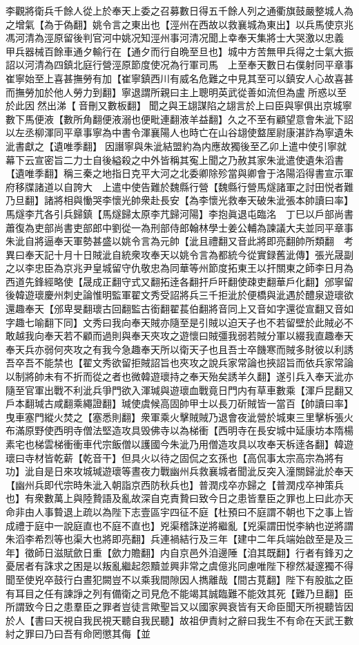 李觀將衛兵千餘人從上於奉天上委之召募數日得五千餘人列之通衢旗鼓嚴整城人為之增氣【為于偽翻】姚令言之東出也【涇州在西故以救襄城為東出】以兵馬使京兆馮河清為涇原留後判官河中姚况知涇州事河清况聞上幸奉天集將士大哭激以忠義甲兵器械百餘車通夕輸行在【通夕而行自晩至旦也】城中方苦無甲兵得之士氣大振詔以河清為四鎮北庭行營涇原節度使况為行軍司馬　上至奉天數日右僕射同平章事崔寧始至上喜甚撫勞有加【崔寧鎮西川有威名危難之中見其至可以鎮安人心故喜甚而撫勞加於他人勞力到翻】寧退謂所親曰主上聰明英武從善如流但為盧所惑以至於此因然出涕【音刪又數板翻】聞之與王翃謀陷之翃言於上曰臣與寧俱出京城寧數下馬便液【數所角翻便液溺也便毗連翻液羊益翻】久之不至有顧望意會朱泚下詔以左丞柳渾同平章事寧為中書令渾襄陽人也時亡在山谷翃使盩厔尉康湛詐為寧遺朱泚書獻之【遺唯季翻】因譖寧與朱泚結盟約為内應故獨後至乙卯上遣中使引寧就幕下云宣密旨二力士自後縊殺之中外皆稱其寃上聞之乃赦其家朱泚遣使遺朱滔書【遺唯季翻】稱三秦之地指日克平大河之北委卿除殄當與卿會于洛陽滔得書宣示軍府移牒諸道以自誇大　上遣中使告難於魏縣行營【魏縣行營馬燧諸軍之討田悦者難乃旦翻】諸將相與慟哭李懷光帥衆赴長安【為李懷光救奉天破朱泚張本帥讀曰率】馬燧李芁各引兵歸鎮【馬燧歸太原李芁歸河陽】李抱眞退屯臨洺　丁巳以戶部尚書蕭復為吏部尚書吏部郎中劉從一為刑部侍郎翰林學士姜公輔為諫議大夫並同平章事　朱泚自將逼奉天軍勢甚盛以姚令言為元帥【泚且禮翻又音此將即亮翻帥所類翻　考異曰奉天記十月十日賊泚自統衆攻奉天以姚令言為都統今從實録舊泚傳】張光晟副之以李忠臣為京兆尹皇城留守仇敬忠為同華等州節度拓東王以扞關東之師李日月為西道先鋒經略使【晟成正翻守式又翻拓逹各翻扞戶旰翻使疎吏翻華戶化翻】邠寧留後韓遊瓌慶州刺史論惟明監軍翟文秀受詔將兵三千拒泚於便橋與泚遇於醴泉遊瓌欲還趣奉天【邠卑旻翻瓌古回翻監古銜翻翟萇伯翻將音同上又音如字還從宣翻又音如字趣七喻翻下同】文秀曰我向奉天賊亦隨至是引賊以迫天子也不若留壁於此賊必不敢越我向奉天若不顧而過則與奉天夾攻之遊懷曰賊彊我弱若賊分軍以綴我直趣奉天奉天兵亦弱何夾攻之有我今急趣奉天所以衛天子也且吾士卒饑寒而賊多財彼以利誘吾卒吾不能禁也【翟文秀欲留拒賊詔旨也夾攻之說兵家常論也挾詔旨而依兵家常論以制將帥未有不折而從之者也微韓遊瓌持之奉天殆矣誘羊久翻】遂引兵入奉天泚亦隨至官軍出戰不利泚兵爭門欲入渾瑊與遊瓌血戰竟日門内有草車數乘【渾戶昆翻又戶本翻瑊古咸翻乘繩證翻】瑊使虞候高固帥甲士以長刀斫賊皆一當百【帥讀曰率】曳車塞門縱火焚之【塞悉則翻】衆軍乘火擊賊賊乃退會夜泚營於城東三里擊柝張火布滿原野使西明寺僧法堅造攻具毁佛寺以為梯衝【西明寺在長安城中延康坊本隋楊素宅也梯雲梯衝衝車代宗飯僧以護國今朱泚乃用僧造攻具以攻奉天柝逹各翻】韓遊瓌曰寺材皆乾薪【乾音干】但具火以待之固侃之玄孫也【高侃事太宗高宗為將有功】泚自是日來攻城瑊遊瓌等晝夜力戰幽州兵救襄城者聞泚反突入潼關歸泚於奉天【幽州兵即代宗時朱泚入朝詣京西防秋兵也】普潤戍卒亦歸之【普潤戍卒神策兵也】有衆數萬上與陸贄語及亂故深自克責贄曰致今日之患皆羣臣之罪也上曰此亦天命非由人事䞇退上疏以為陛下志壹區宇四征不庭【杜預曰不庭謂不朝也下之事上皆成禮于庭中一說庭直也不庭不直也】兇渠稽誅逆將繼亂【兇渠謂田悦李納也逆將謂朱滔李希烈等也渠大也將即亮翻】兵連禍結行及三年【建中二年兵端始啟至是及三年】徵師日滋賦歛日重【歛力贍翻】内自京邑外洎邊陲【洎其既翻】行者有鋒刃之憂居者有誅求之困是以叛亂繼起怨黷並興非常之虞億兆同慮唯陛下穆然凝邃獨不得聞至使兇卒鼓行白晝犯闕豈不以乘我間隙因人擕離哉【間古莧翻】陛下有股肱之臣有耳目之任有諫諍之列有備衛之司見危不能竭其誠臨難不能效其死【難乃旦翻】臣所謂致今日之患羣臣之罪者豈徒言歟聖旨又以國家興衰皆有天命臣聞天所視聽皆因於人【書曰天視自我民視天聽自我民聽】故祖伊責紂之辭曰我生不有命在天武王數紂之罪曰乃曰吾有命罔懲其侮【並